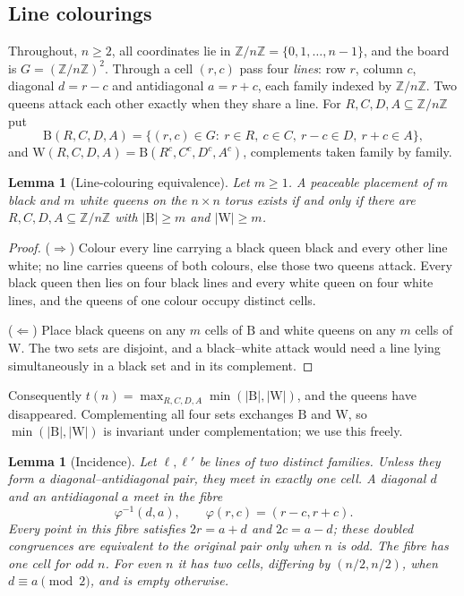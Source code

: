 \documentclass[11pt]{amsart}
\newtheorem{lemma}[theorem]{Lemma}
\theoremstyle{definition}
\theoremstyle{remark}
\newcommand{\Z}{\mathbb{Z}}
\newcommand{\Zn}{\Z/n\Z}
\newcommand{\Bl}{\mathrm{B}}
\newcommand{\Wh}{\mathrm{W}}
\begin{document}
\subsection{Line colourings}

Throughout, $n\ge2$, all coordinates lie in $\Zn=\{0,1,\dots,n-1\}$, and the board is $G=(\Zn)^2$. Through a cell $(r,c)$ pass four \emph{lines}: row $r$, column $c$, diagonal $d=r-c$ and antidiagonal $a=r+c$, each family indexed by $\Zn$. Two queens attack each other exactly when they share a line. For $R,C,D,A\subseteq\Zn$ put
\[
\Bl(R,C,D,A)=\{(r,c)\in G:\ r\in R,\ c\in C,\ r-c\in D,\ r+c\in A\},
\]
and $\Wh(R,C,D,A)=\Bl(R^{c},C^{c},D^{c},A^{c})$, complements taken family by family.

\begin{lemma}[Line-colouring equivalence]\label{lem:lines}
Let $m\ge1$. A peaceable placement of $m$ black and $m$ white queens on the $n\times n$ torus exists if and only if there are $R,C,D,A\subseteq\Zn$ with $|\Bl|\ge m$ and $|\Wh|\ge m$.
\end{lemma}

\begin{proof}
($\Rightarrow$) Colour every line carrying a black queen black and every other line white; no line carries queens of both colours, else those two queens attack. Every black queen then lies on four black lines and every white queen on four white lines, and the queens of one colour occupy distinct cells.

($\Leftarrow$) Place black queens on any $m$ cells of $\Bl$ and white queens on any $m$ cells of $\Wh$. The two sets are disjoint, and a black--white attack would need a line lying simultaneously in a black set and in its complement.
\end{proof}

Consequently $t(n)=\max_{R,C,D,A}\min(|\Bl|,|\Wh|)$, and the queens have disappeared. Complementing all four sets exchanges $\Bl$ and $\Wh$, so $\min(|\Bl|,|\Wh|)$ is invariant under complementation; we use this freely.

\begin{lemma}[Incidence]\label{lem:inc}
Let $\ell,\ell'$ be lines of two distinct families.  Unless they form a
diagonal--antidiagonal pair, they meet in exactly one cell.  A diagonal $d$
and an antidiagonal $a$ meet in the fibre
\[
\varphi^{-1}(d,a),\qquad \varphi(r,c)=(r-c,r+c).
\]
Every point in this fibre satisfies $2r=a+d$ and $2c=a-d$; these doubled
congruences are equivalent to the original pair only when $n$ is odd.  The
fibre has one cell for odd $n$.  For even $n$ it has two cells, differing by
$(n/2,n/2)$, when $d\equiv a\pmod2$, and is empty otherwise.
\end{lemma}
\end{document}
